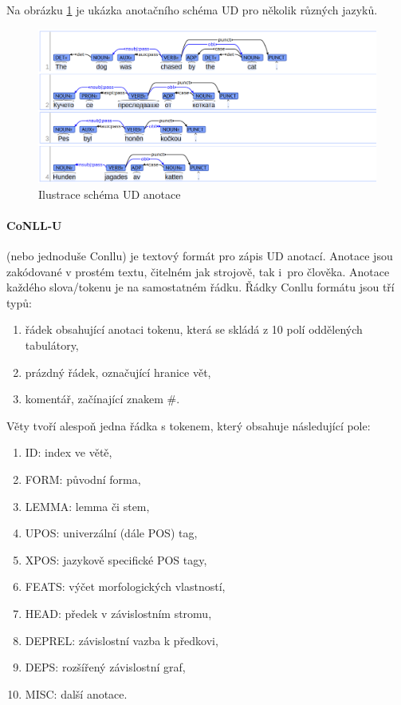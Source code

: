 \documentclass[thesis=M,czech]{FITthesis}[2019/12/23]
\begin{document}
Na obrázku \ref{fig:udscheme} je ukázka anotačního schéma UD pro několik různých jazyků.

\begin{figure}\centering
	\includegraphics[width=1\textwidth]{images/ud_scheme.png}
	\caption{Ilustrace schéma UD anotace\cite{UDweb}}\label{fig:udscheme}
\end{figure}

\paragraph{CoNLL-U}
(nebo jednoduše Conllu) je textový formát pro zápis UD anotací\cite{UDweb}. Anotace jsou zakódované v prostém textu, čitelném jak strojově, tak i~pro člověka. Anotace každého slova/tokenu je na samostatném řádku. Řádky Conllu formátu jsou tří typů:
\begin{enumerate}
    \item řádek obsahující anotaci tokenu, která se skládá z 10 polí oddělených tabulátory,
    \item prázdný řádek, označující hranice vět,
    \item komentář, začínající znakem \#.
\end{enumerate}

Věty tvoří alespoň jedna řádka s tokenem, který obsahuje následující pole:
\begin{enumerate}
    \item ID: index ve větě,
    \item FORM: původní forma,
    \item LEMMA: lemma či stem,
    \item UPOS: univerzální  (dále POS) tag,
    \item XPOS: jazykově specifické POS tagy,
    \item FEATS: výčet morfologických vlastností,
    \item HEAD: předek v závislostním stromu,
    \item DEPREL: závislostní vazba k předkovi,
    \item DEPS: rozšířený závislostní graf,
    \item MISC: další anotace.
\end{enumerate}
\end{document}
